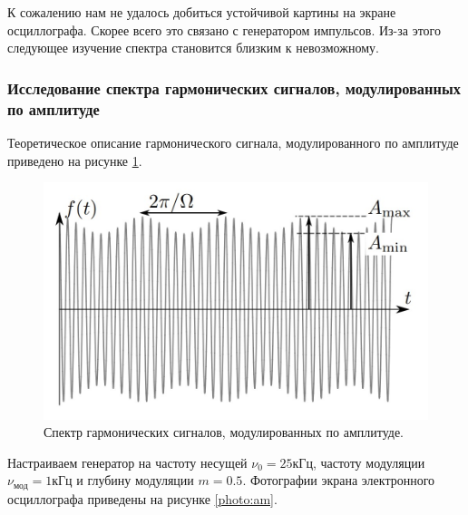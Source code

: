 \documentclass[12pt,a4paper]{article}
\begin{document}
К сожалению нам не удалось добиться устойчивой картины на экране осциллографа. Скорее всего это связано с генератором импульсов. Из-за этого следующее изучение спектра становится близким к невозможному.
	
\subsubsection*{ Исследование спектра гармонических сигналов, модулированных по амплитуде}
Теоретическое описание гармонического сигнала, модулированного по амплитуде приведено на рисунке \ref{res:am}.

\begin{figure}[H]
	\includegraphics[width=0.5\linewidth]{"res/am"}
	\caption{Спектр гармонических сигналов, модулированных по амплитуде.}
	\label{res:am}
\end{figure}

Настраиваем генератор на частоту несущей $\nu_{0} = 25 \text{кГц}$, частоту модуляции
$\nu_{\text{мод}} = 1 \text{кГц}$ и глубину модуляции $m = 0.5$. Фотографии экрана электронного осциллографа приведены на рисунке \ref{photo:am}.	
\end{document}
